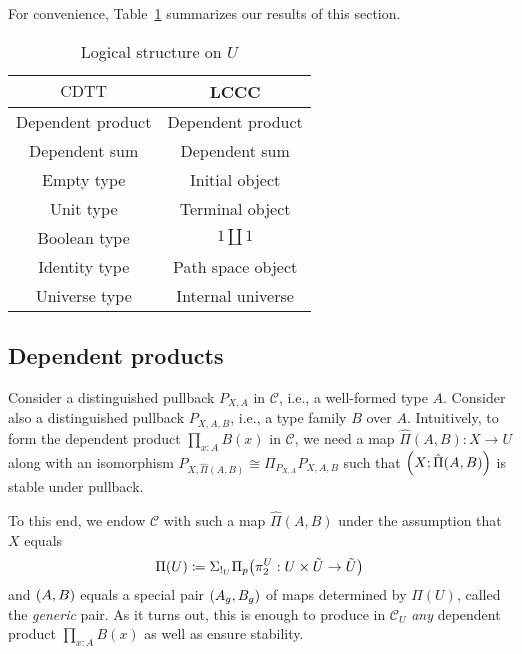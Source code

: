 \documentclass[10pt,letterpaper,cm]{nupset}
\theoremstyle{definition}
\theoremstyle{theorem}
\theoremstyle{remark}
\newcommand{\0}{\mathbf{0}}
\newcommand{\1}{\mathbf{1}}
\newcommand{\2}{\mathbf{2}}
\DeclareMathOperator{\cdtt}{\mathrm{CDTT}}
\renewcommand{\c}{\mathscr{C}}
\begin{document}
\smallskip

For convenience, Table~\ref{tab:ustr} summarizes our results of this section. 

\begin{table}[h!]
\centering
\caption{Logical structure on $U$}
\label{table:4}
\begin{tabular}{||c c||} 
 \hline
 $\cdtt$ & LCCC \\ [0.5ex] 
 \hline\hline
 Dependent product &  Dependent product \\ 
 Dependent sum &  Dependent sum  \\
  Empty type & Initial object  \\
   Unit type & Terminal object  \\
    Boolean type & $1 \coprod 1$  \\
 Identity type & Path space object  \\
 Universe type & Internal universe  \\ [1ex] 
 \hline
\end{tabular}
\label{tab:ustr}
\end{table}



\subsection*{Dependent products}
 Consider a distinguished pullback $P_{X,A}$ in $\c$, i.e., a  well-formed type $A$. Consider also a distinguished pullback $P_{X, A, B}$, i.e., a type family $B$ over $A$. Intuitively, to form the dependent product $\prod_{x:A}B(x)$ in $\c$, we need a map $\hat{\Pi}(A,B) : X\to U$ along with an isomorphism $P_{X, \hat{\Pi}(A,B)} \cong  \Pi_{P_{X,A}}{P_{X, A, B}}$ such that $\mleft(X; \hat{\Pi}(A,B)\mright) $ is stable under pullback.  
 
 \smallskip
 
 To this end, we endow $\c$ with such a map  $ \hat{\Pi}(A,B)$ under the assumption that $X$ equals
 $$ \Pi(U) \coloneqq  \Sigma_{!_U}\Pi_{p}\mleft(\pi_2^U : U \times \tilde{U}\to \tilde{U}\mright)$$ and 
$\mleft(A, B\mright)$ equals a special pair $\mleft(A_g, B_g\mright)$ of maps determined by $\Pi(U)$, called the \textit{generic} pair.
As it turns out, this is enough to produce in $\c_U$ \emph{any} dependent product $\prod_{x:A}B(x)$ as well as ensure stability. 
\end{document}
